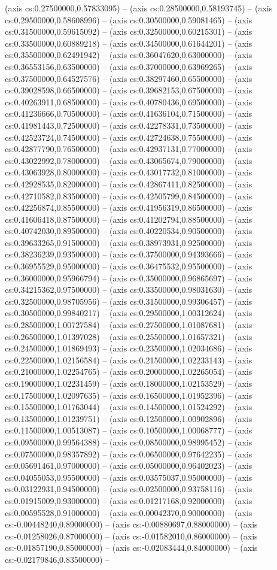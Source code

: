 (axis cs:0.27500000,0.57833095) -- (axis cs:0.28500000,0.58193745) -- (axis cs:0.29500000,0.58608996) -- (axis cs:0.30500000,0.59081465) -- (axis cs:0.31500000,0.59615092) -- (axis cs:0.32500000,0.60215301) -- (axis cs:0.33500000,0.60889218) -- (axis cs:0.34500000,0.61644201) -- (axis cs:0.35500000,0.62491942) -- (axis cs:0.36047620,0.63000000) -- (axis cs:0.36553156,0.63500000) -- (axis cs:0.37000000,0.63969265) -- (axis cs:0.37500000,0.64527576) -- (axis cs:0.38297460,0.65500000) -- (axis cs:0.39028598,0.66500000) -- (axis cs:0.39682153,0.67500000) -- (axis cs:0.40263911,0.68500000) -- (axis cs:0.40780436,0.69500000) -- (axis cs:0.41236666,0.70500000) -- (axis cs:0.41636104,0.71500000) -- (axis cs:0.41981443,0.72500000) -- (axis cs:0.42278331,0.73500000) -- (axis cs:0.42523724,0.74500000) -- (axis cs:0.42724638,0.75500000) -- (axis cs:0.42877790,0.76500000) -- (axis cs:0.42937131,0.77000000) -- (axis cs:0.43022992,0.78000000) -- (axis cs:0.43065674,0.79000000) -- (axis cs:0.43063928,0.80000000) -- (axis cs:0.43017732,0.81000000) -- (axis cs:0.42928535,0.82000000) -- (axis cs:0.42867411,0.82500000) -- (axis cs:0.42710582,0.83500000) -- (axis cs:0.42505799,0.84500000) -- (axis cs:0.42256874,0.85500000) -- (axis cs:0.41956319,0.86500000) -- (axis cs:0.41606418,0.87500000) -- (axis cs:0.41202794,0.88500000) -- (axis cs:0.40742030,0.89500000) -- (axis cs:0.40220534,0.90500000) -- (axis cs:0.39633265,0.91500000) -- (axis cs:0.38973931,0.92500000) -- (axis cs:0.38236239,0.93500000) -- (axis cs:0.37500000,0.94393666) -- (axis cs:0.36955529,0.95000000) -- (axis cs:0.36475532,0.95500000) -- (axis cs:0.36000000,0.95966794) -- (axis cs:0.35000000,0.96865697) -- (axis cs:0.34215362,0.97500000) -- (axis cs:0.33500000,0.98031630) -- (axis cs:0.32500000,0.98705956) -- (axis cs:0.31500000,0.99306457) -- (axis cs:0.30500000,0.99840217) -- (axis cs:0.29500000,1.00312624) -- (axis cs:0.28500000,1.00727584) -- (axis cs:0.27500000,1.01087681) -- (axis cs:0.26500000,1.01397028) -- (axis cs:0.25500000,1.01657321) -- (axis cs:0.24500000,1.01869493) -- (axis cs:0.23500000,1.02034686) -- (axis cs:0.22500000,1.02156584) -- (axis cs:0.21500000,1.02233143) -- (axis cs:0.21000000,1.02254765) -- (axis cs:0.20000000,1.02265054) -- (axis cs:0.19000000,1.02231459) -- (axis cs:0.18000000,1.02153529) -- (axis cs:0.17500000,1.02097635) -- (axis cs:0.16500000,1.01952396) -- (axis cs:0.15500000,1.01763044) -- (axis cs:0.14500000,1.01524292) -- (axis cs:0.13500000,1.01239751) -- (axis cs:0.12500000,1.00902896) -- (axis cs:0.11500000,1.00513087) -- (axis cs:0.10500000,1.00068777) -- (axis cs:0.09500000,0.99564388) -- (axis cs:0.08500000,0.98995452) -- (axis cs:0.07500000,0.98357892) -- (axis cs:0.06500000,0.97642235) -- (axis cs:0.05691461,0.97000000) -- (axis cs:0.05000000,0.96402023) -- (axis cs:0.04055053,0.95500000) -- (axis cs:0.03575037,0.95000000) -- (axis cs:0.03122931,0.94500000) -- (axis cs:0.02500000,0.93758116) -- (axis cs:0.01915009,0.93000000) -- (axis cs:0.01217168,0.92000000) -- (axis cs:0.00595528,0.91000000) -- (axis cs:0.00042370,0.90000000) -- (axis cs:-0.00448240,0.89000000) -- (axis cs:-0.00880697,0.88000000) -- (axis cs:-0.01258026,0.87000000) -- (axis cs:-0.01582010,0.86000000) -- (axis cs:-0.01857190,0.85000000) -- (axis cs:-0.02083444,0.84000000) -- (axis cs:-0.02179846,0.83500000) -- 